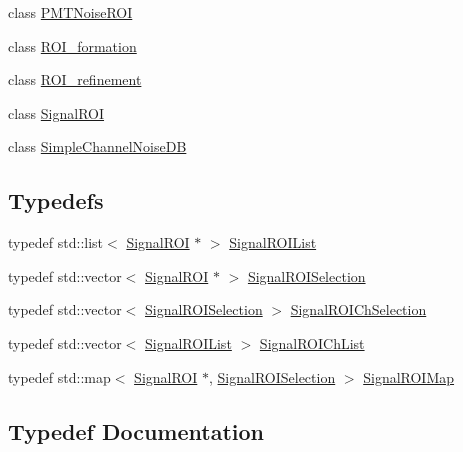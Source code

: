 \begin{DoxyCompactItemize}
\item 
class \hyperlink{class_wire_cell_1_1_sig_proc_1_1_p_m_t_noise_r_o_i}{P\+M\+T\+Noise\+R\+OI}
\item 
class \hyperlink{class_wire_cell_1_1_sig_proc_1_1_r_o_i__formation}{R\+O\+I\+\_\+formation}
\item 
class \hyperlink{class_wire_cell_1_1_sig_proc_1_1_r_o_i__refinement}{R\+O\+I\+\_\+refinement}
\item 
class \hyperlink{class_wire_cell_1_1_sig_proc_1_1_signal_r_o_i}{Signal\+R\+OI}
\item 
class \hyperlink{class_wire_cell_1_1_sig_proc_1_1_simple_channel_noise_d_b}{Simple\+Channel\+Noise\+DB}
\end{DoxyCompactItemize}
\subsection*{Typedefs}
\begin{DoxyCompactItemize}
\item 
typedef std\+::list$<$ \hyperlink{class_wire_cell_1_1_sig_proc_1_1_signal_r_o_i}{Signal\+R\+OI} $\ast$ $>$ \hyperlink{namespace_wire_cell_1_1_sig_proc_a5cefcfe70fe668f822f565375f29f7d7}{Signal\+R\+O\+I\+List}
\item 
typedef std\+::vector$<$ \hyperlink{class_wire_cell_1_1_sig_proc_1_1_signal_r_o_i}{Signal\+R\+OI} $\ast$ $>$ \hyperlink{namespace_wire_cell_1_1_sig_proc_a00d799ccd19bfd30953903f24d36c2a4}{Signal\+R\+O\+I\+Selection}
\item 
typedef std\+::vector$<$ \hyperlink{namespace_wire_cell_1_1_sig_proc_a00d799ccd19bfd30953903f24d36c2a4}{Signal\+R\+O\+I\+Selection} $>$ \hyperlink{namespace_wire_cell_1_1_sig_proc_a071f04d8c720d9f75a43a29eb292a5b6}{Signal\+R\+O\+I\+Ch\+Selection}
\item 
typedef std\+::vector$<$ \hyperlink{namespace_wire_cell_1_1_sig_proc_a5cefcfe70fe668f822f565375f29f7d7}{Signal\+R\+O\+I\+List} $>$ \hyperlink{namespace_wire_cell_1_1_sig_proc_a5b3db127bb7fb1e16d93fa60f52905af}{Signal\+R\+O\+I\+Ch\+List}
\item 
typedef std\+::map$<$ \hyperlink{class_wire_cell_1_1_sig_proc_1_1_signal_r_o_i}{Signal\+R\+OI} $\ast$, \hyperlink{namespace_wire_cell_1_1_sig_proc_a00d799ccd19bfd30953903f24d36c2a4}{Signal\+R\+O\+I\+Selection} $>$ \hyperlink{namespace_wire_cell_1_1_sig_proc_afe3c3ad3e8b38c07bd7d999946b9440c}{Signal\+R\+O\+I\+Map}
\end{DoxyCompactItemize}


\subsection{Typedef Documentation}
\mbox{\label{namespace_wire_cell_1_1_sig_proc_a5b3db127bb7fb1e16d93fa60f52905af}} 
